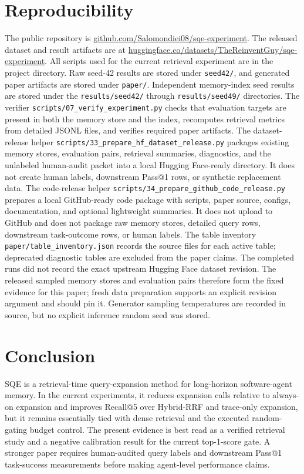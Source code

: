 \documentclass[10pt,twocolumn]{article}
\begin{document}
\section{Reproducibility}
The public repository is
\href{https://github.com/Salomondiei08/sqe-experiment}{github.com/Salomondiei08/sqe-experiment}.
The released dataset and result artifacts are at
\href{https://huggingface.co/datasets/TheReinventGuy/sqe-experiment}{huggingface.co/datasets/TheReinventGuy/sqe-experiment}.
All scripts used for the current retrieval experiment are in the project
directory. Raw seed-42 results are stored under \nolinkurl{seed42/},
and generated paper artifacts are stored under \texttt{paper/}. Independent
memory-index seed results are stored under the
\nolinkurl{results/seed42/} through
\nolinkurl{results/seed49/} directories.
The verifier \nolinkurl{scripts/07_verify_experiment.py} checks that evaluation
targets are present in both the memory store and the index, recomputes retrieval
metrics from detailed JSONL files, and verifies required paper artifacts.
The dataset-release helper \nolinkurl{scripts/33_prepare_hf_dataset_release.py}
packages existing memory stores, evaluation pairs, retrieval summaries,
diagnostics, and the unlabeled human-audit packet into a local Hugging
Face-ready directory. It does not create human labels, downstream Pass@1 rows,
or synthetic replacement data.
The code-release helper \nolinkurl{scripts/34_prepare_github_code_release.py}
prepares a local GitHub-ready code package with scripts, paper source, configs,
documentation, and optional lightweight summaries. It does not upload to
GitHub and does not package raw memory stores, detailed query rows, downstream
task-outcome rows, or human labels.
The table inventory \nolinkurl{paper/table_inventory.json} records the source
files for each active table; deprecated diagnostic tables are excluded from the
paper claims.
The completed runs did not record the exact upstream Hugging Face dataset
revision. The released sampled memory stores and evaluation pairs therefore form
the fixed evidence for this paper; fresh data preparation supports an explicit
revision argument and should pin it. Generator sampling temperatures are recorded
in source, but no explicit inference random seed was stored.

\section{Conclusion}
SQE is a retrieval-time query-expansion method for long-horizon software-agent
memory. In the current experiments, it reduces expansion calls relative to
always-on expansion and improves Recall@5 over Hybrid-RRF and trace-only
expansion, but it remains essentially tied with dense retrieval and the executed
random-gating budget control. The present evidence is best read as a
verified retrieval study and a negative calibration result for the
current top-1-score gate. A stronger paper requires human-audited query labels
and downstream Pass@1 task-success measurements before making agent-level
performance claims.
\end{document}
